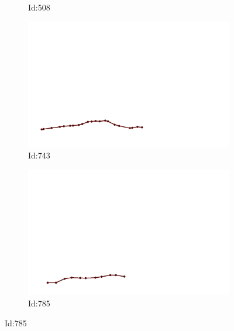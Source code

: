 \documentclass[12pt,twoside]{report}
\begin{document}
\begin{figure}
\begin{subfigure}[b]{0.20\textwidth}
\caption{Id:508}
\end{subfigure}
\begin{subfigure}[b]{0.20\textwidth}
\centering
\includegraphics[width=\textwidth]{../../trajectories/743.png}
\caption{Id:743}
\end{subfigure}
\begin{subfigure}[b]{0.20\textwidth}
\centering
\includegraphics[width=\textwidth]{../../trajectories/785.png}
\caption{Id:785}
\end{subfigure}
\end{figure}
\end{document}
